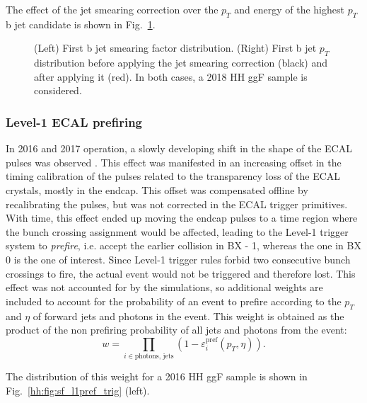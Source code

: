 \documentclass[../main.tex]{subfiles}
\begin{document}
The effect of the jet smearing correction over the $p_T$ and energy of the highest $p_T$ b jet candidate is shown in Fig.~\ref{hh:fig:smearing}. 

\begin{figure}[h!]
\begin{center}
\end{center}
\caption[Jet smearing]{(Left) First b jet smearing factor distribution. (Right) First b jet $p_T$ distribution before applying the jet smearing correction (black) and after applying it (red). In both cases, a 2018 HH ggF sample is considered.}
\label{hh:fig:smearing}
\end{figure}


\subsubsection*{Level-1 ECAL prefiring}

In 2016 and 2017 operation, a slowly developing shift in the shape of the ECAL pulses was observed \cite{intro:l1_13tev}. This effect was manifested in an increasing offset in the timing calibration of the pulses related to the transparency loss of the ECAL crystals, mostly in the endcap. This offset was compensated offline by recalibrating the pulses, but was not corrected in the ECAL trigger primitives. With time, this effect ended up moving the endcap pulses to a time region where the bunch crossing assignment would be affected, leading to the Level-1 trigger system to \textit{prefire}, i.e. accept the earlier collision in BX - 1, whereas the one in BX 0 is the one of interest. Since Level-1 trigger rules forbid two consecutive bunch crossings to fire, the actual event would not be triggered and therefore lost. This effect was not accounted for by the simulations, so additional weights are included to account for the probability of an event to prefire according to the $p_T$ and $\eta$ of forward jets and photons in the event. This weight is obtained as the product of the non prefiring probability of all jets and photons from the event:
\begin{equation}
w = \prod_{i\in\text{photons, jets}} (1 - \varepsilon_i^\text{pref}(p_T, \eta)).
\end{equation}

The distribution of this weight for a 2016 HH ggF sample is shown in Fig.~\ref{hh:fig:sf_l1pref_trig} (left).
\end{document}
